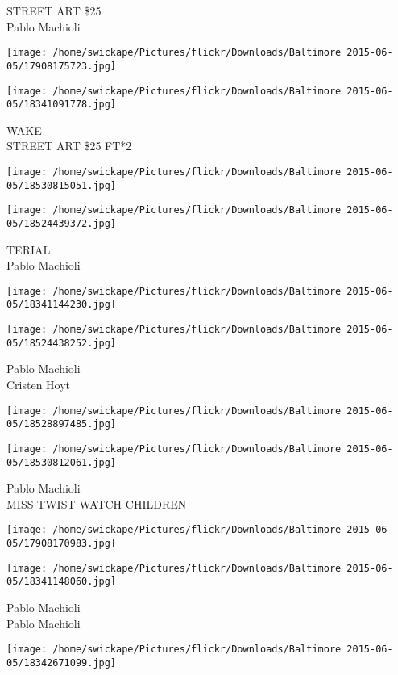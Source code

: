 \documentclass[10pt,letterpaper]{article}
\begin{document}
STREET ART \$25\\
Pablo Machioli
\pagebreak

\texttt{[image: /home/swickape/Pictures/flickr/Downloads/Baltimore 2015-06-05/17908175723.jpg]}

\vspace{0.25in}
\texttt{[image: /home/swickape/Pictures/flickr/Downloads/Baltimore 2015-06-05/18341091778.jpg]}

WAKE\\
STREET ART \$25 FT*2
\pagebreak

\texttt{[image: /home/swickape/Pictures/flickr/Downloads/Baltimore 2015-06-05/18530815051.jpg]}

\vspace{0.25in}
\texttt{[image: /home/swickape/Pictures/flickr/Downloads/Baltimore 2015-06-05/18524439372.jpg]}

TERIAL\\
Pablo Machioli
\pagebreak

\texttt{[image: /home/swickape/Pictures/flickr/Downloads/Baltimore 2015-06-05/18341144230.jpg]}

\vspace{0.25in}
\texttt{[image: /home/swickape/Pictures/flickr/Downloads/Baltimore 2015-06-05/18524438252.jpg]}

Pablo Machioli\\
Cristen Hoyt
\pagebreak

\texttt{[image: /home/swickape/Pictures/flickr/Downloads/Baltimore 2015-06-05/18528897485.jpg]}

\vspace{0.25in}
\texttt{[image: /home/swickape/Pictures/flickr/Downloads/Baltimore 2015-06-05/18530812061.jpg]}

Pablo Machioli\\
MISS TWIST WATCH CHILDREN
\pagebreak

\texttt{[image: /home/swickape/Pictures/flickr/Downloads/Baltimore 2015-06-05/17908170983.jpg]}

\vspace{0.25in}
\texttt{[image: /home/swickape/Pictures/flickr/Downloads/Baltimore 2015-06-05/18341148060.jpg]}

Pablo Machioli\\
Pablo Machioli
\pagebreak

\texttt{[image: /home/swickape/Pictures/flickr/Downloads/Baltimore 2015-06-05/18342671099.jpg]}
\end{document}
